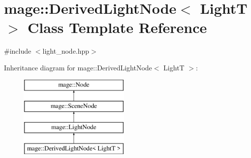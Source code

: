 \hypertarget{classmage_1_1_derived_light_node}{}\section{mage\+:\+:Derived\+Light\+Node$<$ LightT $>$ Class Template Reference}
\label{classmage_1_1_derived_light_node}


{\ttfamily \#include $<$light\+\_\+node.\+hpp$>$}

Inheritance diagram for mage\+:\+:Derived\+Light\+Node$<$ LightT $>$\+:\begin{figure}[H]
\begin{center}
\leavevmode
\includegraphics[height=4.000000cm]{classmage_1_1_derived_light_node}
\end{center}
\end{figure}
